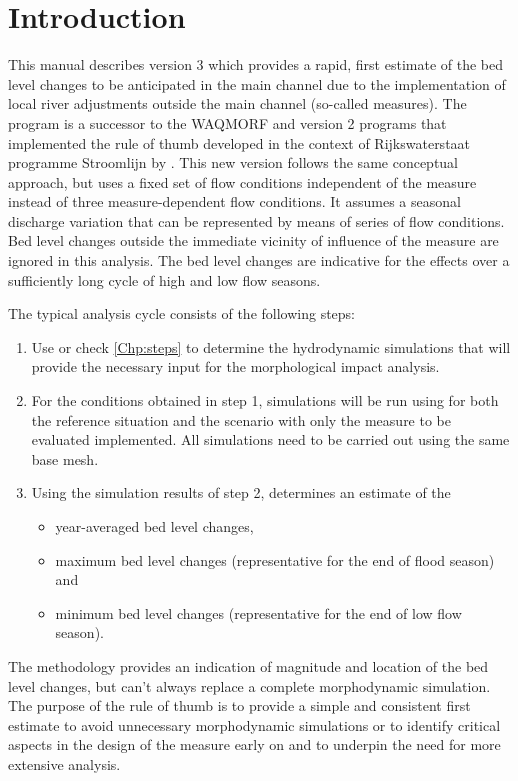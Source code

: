 \chapter{Introduction}

This manual describes \dfastmi version 3 which provides a rapid, first estimate of the bed level changes to be anticipated in the main channel due to the implementation of local river adjustments outside the main channel (so-called measures).
The program is a successor to the WAQMORF and \dfastmi version 2 programs that implemented the rule of thumb developed in the context of Rijkswaterstaat programme Stroomlijn by \citep{Sieben2008}.
This new version follows the same conceptual approach, but uses a fixed set of flow conditions independent of the measure instead of three measure-dependent flow conditions.
It assumes a seasonal discharge variation that can be represented by means of series of flow conditions.
Bed level changes outside the immediate vicinity of influence of the measure are ignored in this analysis.
The bed level changes are indicative for the effects over a sufficiently long cycle of high and low flow seasons.

The typical analysis cycle consists of the following steps:

\begin{enumerate}
\item Use \dfastmi or check \autoref{Chp:steps} to determine the hydrodynamic simulations that will provide the necessary input for the morphological impact analysis.

\item For the conditions obtained in step 1, simulations will be run using \dflowfm for both the reference situation and the scenario with only the measure to be evaluated implemented.
All simulations need to be carried out using the same base mesh.

\item Using the simulation results of step 2, \dfastmi determines an estimate of the
\begin{itemize}
\item year-averaged bed level changes,
\item maximum bed level changes (representative for the end of flood season) and
\item minimum bed level changes (representative for the end of low flow season).
\end{itemize}
\end{enumerate}

The methodology provides an indication of magnitude and location of the bed level changes, but can't always replace a complete morphodynamic simulation.
The purpose of the rule of thumb is to provide a simple and consistent first estimate to avoid unnecessary morphodynamic simulations or to identify critical aspects in the design of the measure early on and to underpin the need for more extensive analysis.


